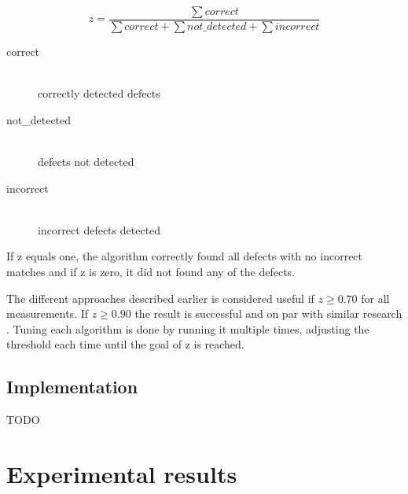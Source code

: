 \documentclass[a4paper,12pt]{article}
\begin{document}
$$z = \frac{\sum correct}{\sum correct + \sum not\_detected + \sum incorrect}$$
\begin{description}
  \item[correct] \hfill \\
  		correctly detected defects
  \item[not\_detected] \hfill \\
  		defects not detected
  \item[incorrect] \hfill \\
   		incorrect defects detected
\end{description}

If z equals one, the algorithm correctly found all defects with no incorrect matches and if z is zero, it did not found any of the defects.

The different approaches described earlier is considered useful if $z \geq 0.70$ for all measurements. If $z \geq 0.90$ the result is successful and on par with similar research \cite{frunza2006automatic, frunzaInkpen2009identification}. Tuning each algorithm is done by running it multiple times, adjusting the threshold each time until the goal of z is reached.


\subsection{Implementation}
\label{sec:implementation}
TODO

\section{Experimental results}
\label{sec:experimentalresults}
\end{document}
